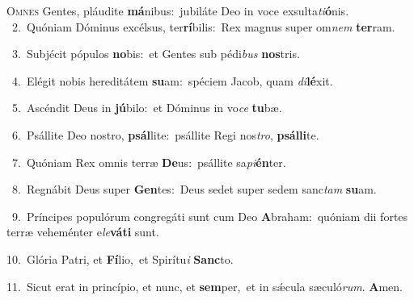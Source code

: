 \lettrine{\initial\textcolor{\initialcolor}{O}}{mnes} Gentes, pláudite \textbf{má}\-nibus:~\star jubiláte Deo in voce exsulta\-\textit{ti}\-\textbf{ó}nis.\\
{\numbfont\textcolor{\numbcolor}{~2.}}~Quóniam Dóminus excélsus, ter\-\textbf{rí}\-bilis:~\star Rex magnus super om\textit{nem} \textbf{ter}\-ram.\par
{\numbfont\textcolor{\numbcolor}{~3.}}~Subjécit pópulos \textbf{no}\-bis:~\star et Gentes sub pédi\textit{bus} \textbf{nos}\-tris.\par
{\numbfont\textcolor{\numbcolor}{~4.}}~Elégit nobis hereditátem \textbf{su}\-am:~\star spéciem Jacob, quam \textit{di}\-\textbf{lé}xit.\par
{\numbfont\textcolor{\numbcolor}{~5.}}~Ascéndit Deus in \textbf{jú}\-bilo:~\star et Dóminus in vo\textit{ce} \textbf{tu}\-bæ.\par
{\numbfont\textcolor{\numbcolor}{~6.}}~Psállite Deo nostro, \textbf{psál}\-lite:~\star psállite Regi nos\-\textit{tro}\-, \textbf{psál}\-\textbf{li}te.\par
{\numbfont\textcolor{\numbcolor}{~7.}}~Quóniam Rex omnis terræ \textbf{De}\-us:~\star psállite sa\-\textit{pi}\-\textbf{én}ter.\par
{\numbfont\textcolor{\numbcolor}{~8.}}~Regnábit Deus super \textbf{Gen}\-tes:~\star Deus sedet super sedem sanc\textit{tam} \textbf{su}\-am.\par
{\numbfont\textcolor{\numbcolor}{~9.}}~Príncipes populórum congregáti sunt cum Deo \textbf{A}\-braham:~\star quóniam dii fortes terræ veheménter e\-\textit{le}\-\textbf{vá}\textbf{ti} sunt.\par
{\numbfont\textcolor{\numbcolor}{10.}}~Glória Patri, et \textbf{Fí}\-lio,~\star et Spirítu\textit{i} \textbf{Sanc}\-to.\par
{\numbfont\textcolor{\numbcolor}{11.}}~Sicut erat in princípio, et nunc, et \textbf{sem}\-per,~\star et in sǽcula sæculó\-\textit{rum}\-. \textbf{A}\-men.\par
